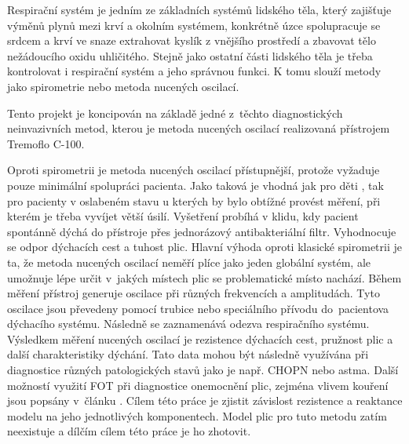 Respirační systém je jedním ze základních systémů lidského těla, který zajišťuje výměnů plynů mezi krví a okolním systémem, konkrétně úzce spolupracuje se srdcem a krví ve snaze extrahovat kyslík z vnějšího prostředí a zbavovat tělo nežádoucího oxidu uhličitého. \cite{muni} Stejně jako ostatní části lidského těla je třeba kontrolovat i respirační systém a jeho správnou funkci. K tomu slouží metody jako spirometrie nebo metoda nucených oscilací. 

Tento projekt je koncipován na základě jedné z~těchto diagnostických neinvazivních metod, kterou je metoda nucených oscilací realizovaná přístrojem Tremoflo C-100.  

Oproti spirometrii je metoda nucených oscilací přístupnější, protože vyžaduje pouze minimální spolupráci pacienta. Jako taková je vhodná jak pro děti \cite{StarczewskaDymek2019}, tak pro pacienty v oslabeném stavu u kterých by bylo obtížné provést měření, při kterém je třeba vyvíjet větší úsilí. \cite{Vlcek2018} Vyšetření probíhá v klidu, kdy pacient spontánně dýchá do přístroje přes jednorázový antibakteriální filtr. Vyhodnocuje se odpor dýchacích cest a tuhost plic. \cite{Vlcek2018}
Hlavní výhoda oproti klasické spirometrii je ta, že metoda nucených oscilací neměří plíce jako jeden globální systém, ale umožnuje lépe určit v~jakých místech plic se problematické místo nachází. \cite{Bhattarai27August2020}
Během měření přístroj generuje oscilace při různých frekvencích a amplitudách. Tyto oscilace jsou převedeny pomocí trubice nebo speciálního přívodu do~pacientova dýchacího systému. Následně se zaznamenává odezva respiračního systému. Výsledkem měření nucených oscilací je rezistence dýchacích cest, pružnost plic a další charakteristiky dýchání. Tato data mohou být následně využívána při diagnostice různých patologických stavů jako je např. CHOPN nebo astma. \cite{Vlcek2018}
Další možností využití FOT při diagnostice onemocnění plic, zejména vlivem kouření jsou popsány v~článku \cite{OliveiraRibeiro2018}.
Cílem této práce je zjistit závislost rezistence a reaktance modelu na jeho jednotlivých komponentech. \cite{Vlcek2018}
Model plic pro tuto metodu zatím neexistuje a dílčím cílem této práce je ho zhotovit.
